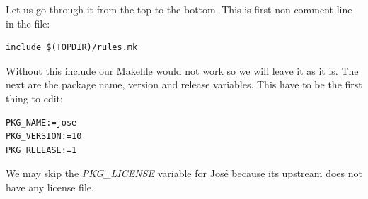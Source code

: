 Let us go through it from the top to the bottom.
This is first non comment line in the file:
\begin{lstlisting}[columns=fixed,basicstyle=\ttfamily\footnotesize,tabsize=4,backgroundcolor=\color{yellow!10}]
include $(TOPDIR)/rules.mk
\end{lstlisting}
Without this include our Makefile would not work so we will leave it as it is.
The next are the package name, version and release variables.
This have to be the first thing to edit:
\begin{lstlisting}[columns=fixed,basicstyle=\ttfamily\footnotesize,tabsize=4,backgroundcolor=\color{yellow!10}]
PKG_NAME:=jose
PKG_VERSION:=10
PKG_RELEASE:=1
\end{lstlisting}
We may skip the {\it PKG\_LICENSE} variable for José because its upstream does not have any license file.


